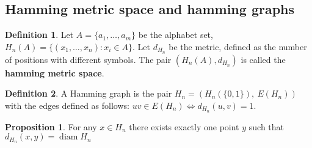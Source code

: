 \documentclass{article}
\theoremstyle{definition}
\newtheorem{prop}{Proposition}[section]
\newtheorem{dd}{Definition}[section]
\DeclareMathOperator{\diam}{diam}
\begin{document}
\subsection{Hamming metric space and hamming graphs}

\begin{dd}
    Let $A = \{a_1, \dots, a_m\}$ be the alphabet set, $H_n(A) = \{(x_1, \dots, x_n): x_i \in A\}$. Let $d_{H_n}$ be the metric, defined as the number of positions with different symbols. The pair $\left( H_n(A), d_{H_n} \right)$ is called the \textbf{hamming metric space}.
\end{dd}

\begin{dd}
    A Hamming graph is the pair $H_n = \left( H_n(\{0, 1\}),\ E(H_n) \right)$ with the edges defined as follows: $uv \in E(H_n) \iff d_{H_n}(u, v) = 1$.
\end{dd}

\begin{prop}
    For any $x \in H_n$ there exists exactly one point $y$ such that $d_{H_n}(x, y) = \diam H_n$
\end{prop}
\end{document}
